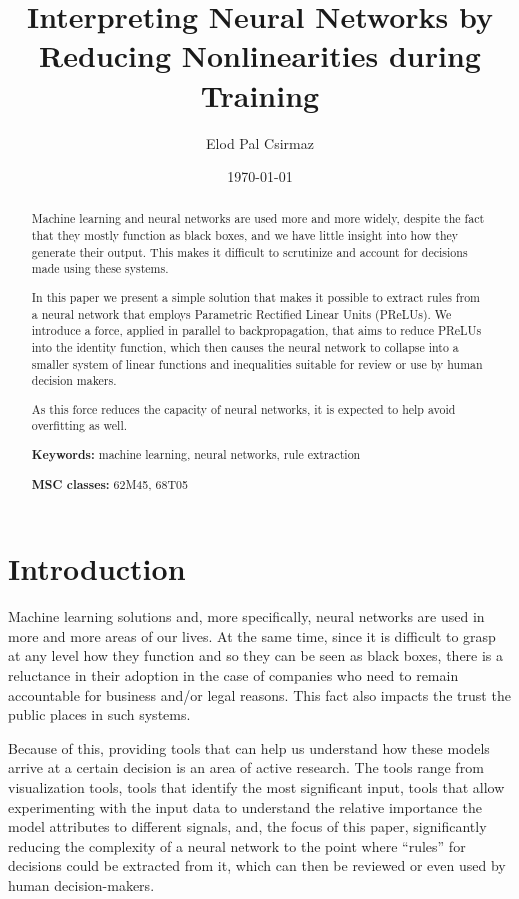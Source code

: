 \documentclass{article}[12pt]
\title{Interpreting Neural Networks by Reducing Nonlinearities during Training}
\author{Elod Pal Csirmaz\\
\texttt{\rot{\rot{maz.}{csir}{ep}com}{@}{elod}}}
\date{\today}
\newcommand{\myskip}{\bigskip\noindent}
\begin{document}
\maketitle

\begin{abstract}
Machine learning and neural networks are used more and more widely,
despite the fact that they mostly function as black boxes, and we
have little insight into how they generate their output.
This makes it difficult to scrutinize and account for decisions made using these systems.

In this paper we present a simple solution that makes it possible to
extract rules from a neural network that employs Parametric Rectified Linear Units (PReLUs).
We introduce a force, applied in parallel to backpropagation, that
aims to reduce PReLUs into the identity function, which then causes
the neural network to collapse into a smaller system of linear functions and inequalities
suitable for review or use by human decision makers.

As this force reduces the capacity of neural networks, it is expected to help avoid overfitting as well.

\myskip
{\bf Keywords:} %
machine learning,
neural networks,
rule extraction

\myskip
{\bf MSC classes:} %
62M45,  %
68T05   %


\end{abstract}

\section{Introduction}

Machine learning solutions and, more specifically, neural networks are used
in more and more areas of our lives. At the same time, since it is difficult to 
grasp at any level how they function and so they can be seen as black boxes,
there is a reluctance in their adoption in the case of companies who need to
remain accountable for business and/or legal reasons. This fact also impacts
the trust the public places in such systems.

Because of this, providing tools that can help us understand how these
models arrive at a certain decision is an area of active research.
The tools range from visualization tools, tools that identify the
most significant input, tools that allow experimenting with the input data
to understand the relative importance the model attributes to different
signals, and, the focus of this paper, significantly reducing the complexity
of a neural network to the point where ``rules'' for decisions could be
extracted from it, which can then be reviewed or even used by human decision-makers.
\end{document}
